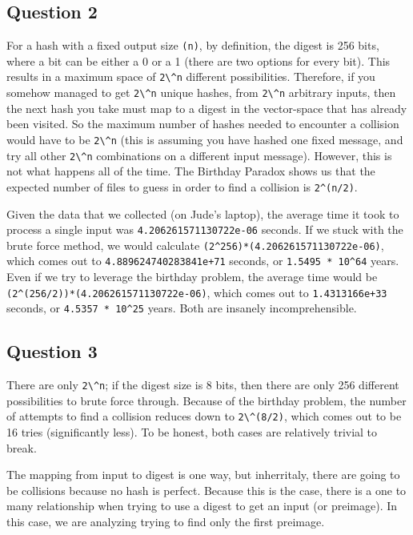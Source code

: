 \documentclass[11pt]{article}
\begin{document}
\subsection*{Question 2}
For a hash with a fixed output size \verb|(n)|, by definition, the digest is 256 bits, where a bit can be either a 0 or a 1 (there are two options for every bit). This results in a maximum space of \verb|2\^n| different possibilities. Therefore, if you somehow managed to get \verb|2\^n| unique hashes, from \verb|2\^n| arbitrary inputs, then the next hash you take must map to a digest in the vector-space that has already been visited. So the maximum number of hashes needed to encounter a collision would have to be \verb|2\^n| (this is assuming you have hashed one fixed message, and try all other \verb|2\^n| combinations on a different input message). However, this is not what happens all of the time. The Birthday Paradox shows us that the expected number of files to guess in order to find a collision is \verb|2^(n/2)|.

Given the data that we collected (on Jude's laptop), the average time it took to process a single input was \verb|4.206261571130722e-06| seconds. If we stuck with the brute force method, we would calculate \verb|(2^256)*(4.206261571130722e-06)|, which comes out to \verb|4.889624740283841e+71| seconds, or \verb|1.5495 * 10^64| years. Even if we try to leverage the birthday problem, the average time would be \verb|(2^(256/2))*(4.206261571130722e-06)|, which comes out to \verb|1.4313166e+33| seconds, or \verb|4.5357 * 10^25| years. Both are insanely incomprehensible.

\subsection*{Question 3}
There are only \verb|2\^n|; if the digest size is 8 bits, then there are only 256 different possibilities to brute force through. Because of the birthday problem, the number of attempts to find a collision reduces down to \verb|2\^(8/2)|, which comes out to be 16 tries (significantly less). To be honest, both cases are relatively trivial to break.

The mapping from input to digest is one way, but inherritaly, there are going to be collisions because no hash is perfect. Because this is the case, there is a one to many relationship when trying to use a digest to get an input (or preimage). In this case, we are analyzing trying to find only the first preimage. 
\end{document}
